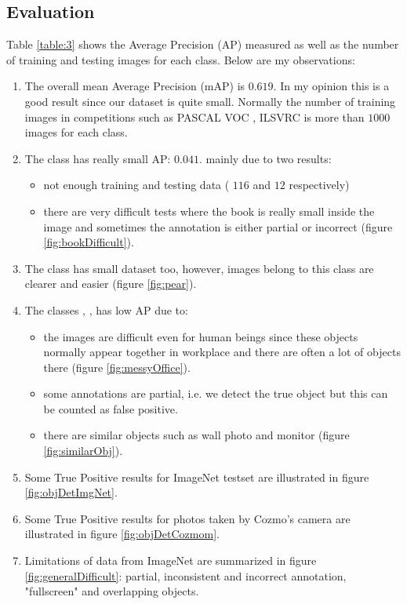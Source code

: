 \subsection{Evaluation}
Table \ref{table:3} shows the Average Precision (AP) measured as well as the number of training and testing images for each class. Below are my observations:
\begin{enumerate}
	\item The overall mean Average Precision (mAP) is $0.619$. In my opinion this is a good result since our dataset is quite small. Normally the number of training images in competitions such as PASCAL VOC \cite{Everingham2010}, ILSVRC \cite{ILSVRC15} is more than $1000$ images for each class.
	\item The class  has really small AP: $0.041$. mainly due to two results:
	\begin{itemize}
		\item not enough training and testing data ( $116$ and $12$ respectively)
		\item there are very difficult tests where the book is really small inside the image and sometimes the annotation is either partial or incorrect (figure \ref{fig:bookDifficult}).
	\end{itemize}
	\item The class  has small dataset too, however, images belong to this class are clearer and easier (figure \ref{fig:pear}).
	\item The classes , ,  has low AP due to:
	\begin{itemize}
		\item the images are difficult even for human beings since these objects normally appear together in workplace and there are often a lot of objects there (figure \ref{fig:messyOffice}).
		\item some annotations are partial, i.e. we detect the true object but this can be counted as false positive.
		\item there are similar objects such as wall photo and monitor (figure \ref{fig:similarObj}).
	\end{itemize}
	\item Some True Positive results for ImageNet testset are illustrated in figure \ref{fig:objDetImgNet}.
	\item Some True Positive results for photos taken by Cozmo's camera are illustrated in figure \ref{fig:objDetCozmom}.
	\item Limitations of data from ImageNet are summarized in figure \ref{fig:generalDifficult}: partial, inconsistent and incorrect annotation, "fullscreen" and overlapping objects.
\end{enumerate}

